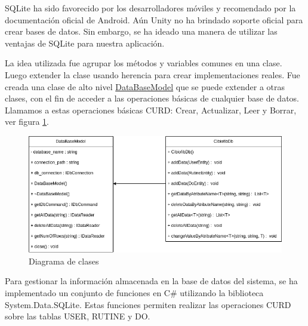 SQLite ha sido favorecido por los desarrolladores móviles y recomendado por la documentación oficial de Android. Aún Unity no ha brindado soporte oficial para crear bases de datos. Sin embargo, se ha ideado una manera de utilizar las ventajas de SQLite para nuestra aplicación.

\vspace{5pt}
La idea utilizada fue agrupar los métodos y variables comunes en una clase. Luego extender la clase usando herencia para crear implementaciones reales. Fue creada una clase de alto nivel \underline{DataBaseModel}  que se puede extender a otras clases, con el fin de acceder a las operaciones básicas de cualquier base de datos. Llamamos a estas operaciones básicas CURD: Crear, Actualizar, Leer y Borrar, ver figura \ref{fig: diagram-db}.

\begin{figure}[ht]
    \centering
    \includegraphics[scale=0.6]{images/diagram-db.png}
    \caption{Diagrama de clases}
    \label{fig: diagram-db}
\end{figure}

Para gestionar la información almacenada en la base de datos del sistema, se ha implementado un conjunto de funciones en C\# utilizando la biblioteca System.Data.SQLite. Estas funciones permiten realizar las operaciones CURD sobre las tablas USER, RUTINE y DO.

